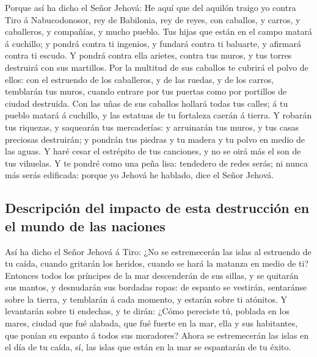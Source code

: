  Porque así ha dicho el Señor Jehová: He aquí que del
aquilón traigo yo contra Tiro á Nabucodonosor, rey de Babilonia, rey de
reyes, con caballos, y carros, y caballeros, y compañías, y mucho
pueblo.  Tus hijas que están en el campo matará á
cuchillo; y pondrá contra ti ingenios, y fundará contra ti baluarte, y
afirmará contra ti escudo.  Y pondrá contra ella arietes,
contra tus muros, y tus torres destruirá con sus martillos.
 Por la multitud de sus caballos te cubrirá el polvo de
ellos: con el estruendo de los caballeros, y de las ruedas, y de los
carros, temblarán tus muros, cuando entrare por tus puertas como por
portillos de ciudad destruída.  Con las uñas de sus
caballos hollará todas tus calles; á tu pueblo matará á cuchillo, y las
estatuas de tu fortaleza caerán á tierra.  Y robarán tus
riquezas, y saquearán tus mercaderías: y arruinarán tus muros, y tus
casas preciosas destruirán; y pondrán tus piedras y tu madera y tu polvo
en medio de las aguas.  Y haré cesar el estrépito de tus
canciones, y no se oirá más el son de tus vihuelas.  Y te
pondré como una peña lisa: tendedero de redes serás; ni nunca más serás
edificada: porque yo Jehová he hablado, dice el Señor Jehová.

\hypertarget{descripciuxf3n-del-impacto-de-esta-destrucciuxf3n-en-el-mundo-de-las-naciones}{%
\subsection{Descripción del impacto de esta destrucción en el mundo de
las
naciones}\label{descripciuxf3n-del-impacto-de-esta-destrucciuxf3n-en-el-mundo-de-las-naciones}}

 Así ha dicho el Señor Jehová á Tiro: ¿No se estremecerán
las islas al estruendo de tu caída, cuando gritarán los heridos, cuando
se hará la matanza en medio de ti?  Entonces todos los
príncipes de la mar descenderán de sus sillas, y se quitarán sus mantos,
y desnudarán sus bordadas ropas: de espanto se vestirán, sentaránse
sobre la tierra, y temblarán á cada momento, y estarán sobre ti
atónitos.  Y levantarán sobre ti endechas, y te dirán:
¿Cómo pereciste tú, poblada en los mares, ciudad que fué alabada, que
fué fuerte en la mar, ella y sus habitantes, que ponían su espanto á
todos sus moradores?  Ahora se estremecerán las islas en
el día de tu caída, sí, las islas que están en la mar se espantarán de
tu éxito.

